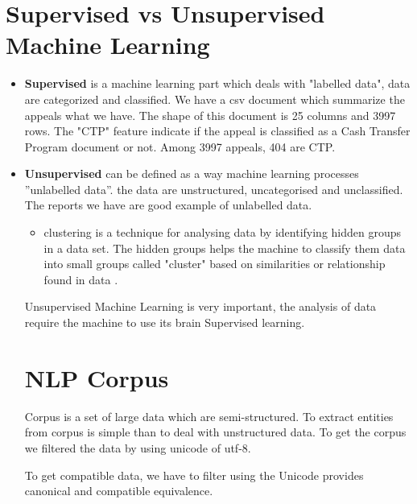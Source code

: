 \section{Supervised vs Unsupervised  Machine Learning}
\begin{itemize}
\item \textbf{Supervised} is a machine learning part which deals with "labelled data",  data are categorized and classified. We have a csv document which summarize the appeals what we have. The shape of this document is 25 columns and 3997 rows. The "CTP" feature indicate if the appeal is classified as a Cash
Transfer Program document  or not. Among 3997 appeals, 404 are CTP. 

\item \textbf{Unsupervised} can be defined as a way machine learning processes ”unlabelled data”.
the data are unstructured, uncategorised and unclassified. The reports we have are good example of unlabelled data.
\begin{itemize}
\item clustering is a technique for analysing data by identifying hidden groups in a data set. The hidden groups helps the machine to  classify them data into small groups called "cluster" based on similarities or relationship found in data \citep{dy2004feature}.
\end{itemize}
Unsupervised Machine Learning is very important, the analysis of data require the machine to use its brain Supervised learning.
\section{NLP Corpus}
Corpus is a set of large data which are semi-structured.  To extract entities from corpus is simple than to deal with unstructured data. To get the corpus we filtered the data by using unicode of utf-8.

To get compatible data, we have to filter using the Unicode provides canonical and compatible equivalence.



\end{itemize}
